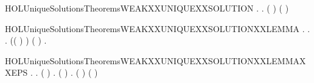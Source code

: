 \newcommand{\HOLUniqueSolutionsTheoremsUNIQUEXXSOLUTIONXXOFXXROOTEDXXCONTRACTIONS}{\UseVerbatim{HOLUniqueSolutionsTheoremsUNIQUEXXSOLUTIONXXOFXXROOTEDXXCONTRACTIONS}}
\begin{SaveVerbatim}{HOLUniqueSolutionsTheoremsWEAKXXUNIQUEXXSOLUTION}
\HOLTokenTurnstile{} \HOLSymConst{\HOLTokenForall{}}.
         \HOLSymConst{\HOLTokenConj{}}   \HOLSymConst{\HOLTokenImp{}}
       \HOLSymConst{\HOLTokenForall{}} .
             ( ) \HOLSymConst{\HOLTokenConj{}}   ( ) \HOLSymConst{\HOLTokenImp{}}
             
\end{SaveVerbatim}
\newcommand{\HOLUniqueSolutionsTheoremsWEAKXXUNIQUEXXSOLUTION}{\UseVerbatim{HOLUniqueSolutionsTheoremsWEAKXXUNIQUEXXSOLUTION}}
\begin{SaveVerbatim}{HOLUniqueSolutionsTheoremsWEAKXXUNIQUEXXSOLUTIONXXLEMMA}
\HOLTokenTurnstile{} \HOLSymConst{\HOLTokenForall{}}.
         \HOLSymConst{\HOLTokenConj{}}   \HOLSymConst{\HOLTokenImp{}}
       \HOLSymConst{\HOLTokenForall{}}  .
             \HOLTokenTransBegin{}\HOLTokenTransEnd {} \HOLSymConst{\HOLTokenImp{}}
           \HOLSymConst{\HOLTokenExists{}}.
                 \HOLSymConst{\HOLTokenConj{}} (( \HOLSymConst{=} \HOLConst{\ensuremath{\tau}}) \HOLSymConst{\HOLTokenImp{}}  ) \HOLSymConst{\HOLTokenConj{}} ( \HOLSymConst{=}  ) \HOLSymConst{\HOLTokenConj{}}
               \HOLSymConst{\HOLTokenForall{}}.   \HOLTokenTransBegin{}\HOLTokenTransEnd {} 
\end{SaveVerbatim}
\newcommand{\HOLUniqueSolutionsTheoremsWEAKXXUNIQUEXXSOLUTIONXXLEMMA}{\UseVerbatim{HOLUniqueSolutionsTheoremsWEAKXXUNIQUEXXSOLUTIONXXLEMMA}}
\begin{SaveVerbatim}{HOLUniqueSolutionsTheoremsWEAKXXUNIQUEXXSOLUTIONXXLEMMAXXEPS}
\HOLTokenTurnstile{} \HOLSymConst{\HOLTokenForall{}}.
         \HOLSymConst{\HOLTokenConj{}}   \HOLSymConst{\HOLTokenImp{}}
       \HOLSymConst{\HOLTokenForall{}} .
            ( )  \HOLSymConst{\HOLTokenImp{}}
           \HOLSymConst{\HOLTokenExists{}}.   \HOLSymConst{\HOLTokenConj{}}   \HOLSymConst{\HOLTokenConj{}} ( \HOLSymConst{=}  ) \HOLSymConst{\HOLTokenConj{}} \HOLSymConst{\HOLTokenForall{}}.  ( ) ( )
\end{SaveVerbatim}
